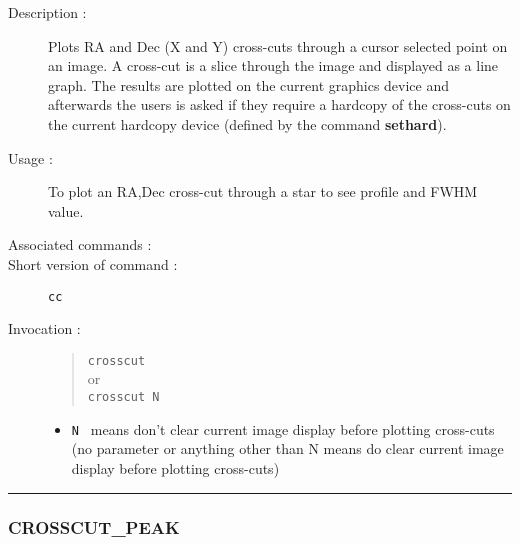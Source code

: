 \begin{description}

\item[Description :] Plots RA and Dec (X and Y) cross-cuts through a
cursor selected point on an image.  A cross-cut is a slice through the
image and displayed as a line graph.  The results are plotted on the
current graphics device and afterwards the users is asked if they
require a hardcopy of the cross-cuts on the current hardcopy device
(defined by the command {\bf sethard}).

\item[Usage :] To plot an RA,Dec cross-cut through a star to see profile
and FWHM value.
\item[Associated commands :] {\tt {}}
\item[Short version of command :] {\tt cc}
\item[Invocation :]

\begin{quote}{\tt  crosscut }\\
or \\
{\tt crosscut N }
\end{quote}

\begin{itemize}

\item {\tt N } means don't clear current image display before plotting
cross-cuts (no parameter or anything other than N means
do clear current image display before plotting cross-cuts)
\end{itemize}

\end{description}

\hrule
\subsubsection*{\label{CROSSCUT_PEAK}CROSSCUT\_PEAK}

